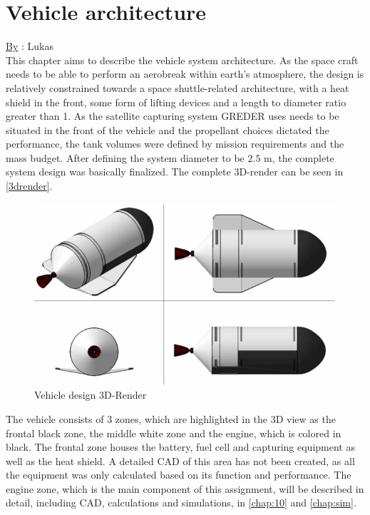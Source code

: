 \chapter{Vehicle architecture}
\qquad \underline{By} : Lukas\\

This chapter aims to describe the vehicle system architecture. As the space craft needs to be able to perform an aerobreak within earth’s atmosphere, the design is relatively constrained towards a space shuttle-related architecture, with a heat shield in the front, some form of lifting devices and a length to diameter ratio greater than 1. As the satellite capturing system GREDER uses needs to be situated in the front of the vehicle and the propellant choices dictated the performance, the tank volumes were defined by mission requirements and the mass budget. After defining the system diameter to be $2.5$ m, the complete system design was basically finalized. The complete 3D-render can be seen in \autoref{3drender}.
\vspace{2cm}
\begin{figure}[H]
	\centering\includegraphics[width=\linewidth]{3drender}
	\caption{Vehicle design 3D-Render}\label{3drender}

\end{figure}

The vehicle consists of 3 zones, which are highlighted in the 3D view as the frontal black zone, the middle white zone and the engine, which is colored in black. The frontal zone houses the battery, fuel cell and capturing equipment as well as the heat shield. A detailed CAD of this area has not been created, as all the equipment was only calculated based on its function and performance. The engine zone, which is the main component of this assignment, will be described in detail, including CAD, calculations and simulations, in \autoref{chap:10} and \autoref{chap:sim}. \\

